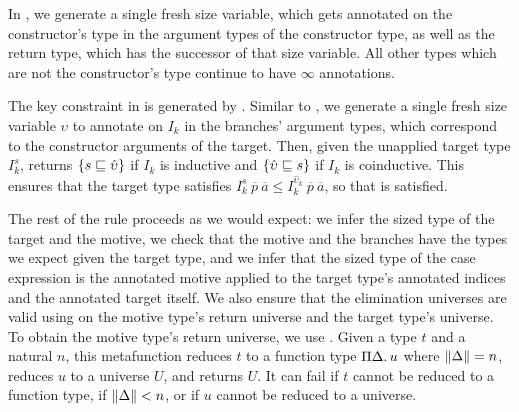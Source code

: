 In , we generate a single fresh size variable, which gets annotated on the constructor's \coinductive type in the argument types of the constructor type, as well as the return type, which has the successor of that size variable.
All other \coinductive types which are not the constructor's \coinductive type continue to have $\infty$ annotations.

The key constraint in  is generated by \casesize.
Similar to , we generate a single fresh size variable $\upsilon$ to annotate on $I_k$ in the branches' argument types, which correspond to the constructor arguments of the target.
Then, given the unapplied target type $I_k^s$, \casesize returns $\{s \sqsubseteq \hat{\upsilon}\}$ if $I_k$ is inductive and $\{\hat{\upsilon} \sqsubseteq s\}$ if $I_k$ is coinductive.
This ensures that the target type satisfies $I_k^s ~ \overline{p} ~ \overline{a} \leq I_k^{\hat{\upsilon}_k} ~ \overline{p} ~ \overline{a}$, so that  is satisfied.

The rest of the rule proceeds as we would expect: we infer the sized type of the target and the motive, we check that the motive and the branches have the types we expect given the target type, and we infer that the sized type of the case expression is the annotated motive applied to the target type's annotated indices and the annotated target itself.
We also ensure that the elimination universes are valid using \elim on the motive type's return universe and the target type's universe.
To obtain the motive type's return universe, we use \decompose.
Given a type $t$ and a natural $n$, this metafunction reduces $t$ to a function type $\Pi \Delta \mathpunct{.} u$ where $\lVert\Delta\rVert = n$, reduces $u$ to a universe $U$, and returns $U$.
It can fail if $t$ cannot be reduced to a function type, if $\lVert\Delta\rVert < n$, or if $u$ cannot be reduced to a universe.

